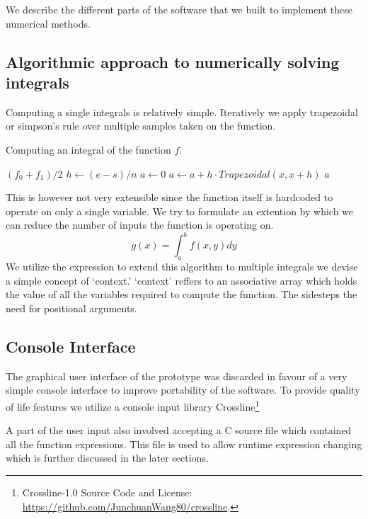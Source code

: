 \documentclass[12pt]{article}
\begin{document}
We describe the different parts of the software that we built to implement these numerical methods.

\subsection{Algorithmic approach to numerically solving integrals}

Computing a single integrals is relatively simple. Iteratively we apply trapezoidal or simpson's rule over multiple
samples taken on the function.

\begin{algorithm}
	\caption{Computing an integral of the function $f$.}
	\begin{algorithmic}[1]
		\State \Return $(f_0 + f_1)/2$
		\EndProcedure
		\Statex
		\State $h \gets (e - s) / n$
		\State $a \gets 0$
		\State $a \gets a + h \cdot Trapezoidal(x, x + h)$
		\EndFor
		\State \Return $a$
		\EndProcedure
	\end{algorithmic}
\end{algorithm}

This is however not very extensible since the function itself is hardcoded to operate on only a single variable. We try
to formulate an extention by which we can reduce the number of inputs the function is operating on.
$$ g(x) = \int_a^b f(x, y) dy $$
We utilize the expression to  extend this algorithm to multiple integrals we devise a simple concept of `context.' `context'
reffers to an associative array which holds the value of all the variables required to compute the function. The sidesteps
the need for positional arguments.

\subsection{Console Interface}

The graphical user interface of the prototype was discarded in favour of a very simple console interface to improve portability of
the software. To provide quality of life features we utilize a console input library Crossline\footnote{Crossline-1.0 Source Code and License: \url{https://github.com/JunchuanWang80/crossline}.}

A part of the user input also involved accepting a C source file which contained all the function expressions. This file is used to allow runtime
expression changing which is further discussed in the later sections.
\end{document}
